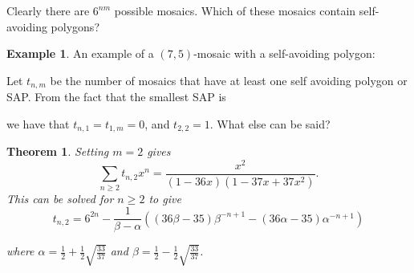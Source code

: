 \documentclass[12pt]{article}
\newtheorem{theorem}{Theorem}
\theoremstyle{plain}
\theoremstyle{definition}
\theoremstyle{remark}
\theoremstyle{definition}
\newtheorem{exmp}{Example}[section]
\newcommand{\cellA}[4]{ \draw[thick] ( #1 , #2 ) rectangle ( #3 , #4 ); \draw[red, thick] (#3 * 0.5 + #1 * 0.5 , #2) -- (#3, #4 * 0.5 + #2 * 0.5);}
\newcommand{\cellB}[4]{ \draw[thick] ( #1 , #2 ) rectangle ( #3 , #4 ); \draw[red, thick] (#3 * 0.5 + #1 * 0.5 , #2) -- (#1, #4 * 0.5 + #2 * 0.5);}
\newcommand{\cellC}[4]{ \draw[thick] ( #1 , #2 ) rectangle ( #3 , #4 ); \draw[red, thick] (#3 * 0.5 + #1 * 0.5 , #4) -- (#1, #4 * 0.5 + #2 * 0.5);}
\newcommand{\cellD}[4]{ \draw[thick] ( #1 , #2 ) rectangle ( #3 , #4 ); \draw[red, thick] (#3 * 0.5 + #1 * 0.5 , #4) -- (#3, #4 * 0.5 + #2 * 0.5);}
\newcommand{\cellE}[4]{ \draw[thick] ( #1 , #2 ) rectangle ( #3 , #4 ); \draw[red, thick] (#3 * 0.5 + #1 * 0.5 , #2) -- (#3 * 0.5 + #1 * 0.5 , #4);}
\newcommand{\cellF}[4]{ \draw[thick] ( #1 , #2 ) rectangle ( #3 , #4 ); \draw[red, thick] (#3, #4 * 0.5 + #2 * 0.5) -- (#1, #4 * 0.5 + #2 * 0.5);}
\newcommand{\cellAf}[4]{\filldraw[gray!40] ( #1 , #2 ) rectangle ( #3 , #4 ); \draw[thick] ( #1 , #2 ) rectangle ( #3 , #4 ); \draw[red, thick] (#3 * 0.5 + #1 * 0.5 , #2) -- (#3, #4 * 0.5 + #2 * 0.5);}
\newcommand{\cellBf}[4]{\filldraw[gray!40] ( #1 , #2 ) rectangle ( #3 , #4 ); \draw[thick] ( #1 , #2 ) rectangle ( #3 , #4 ); \draw[red, thick] (#3 * 0.5 + #1 * 0.5 , #2) -- (#1, #4 * 0.5 + #2 * 0.5);}
\newcommand{\cellCf}[4]{\filldraw[gray!40] ( #1 , #2 ) rectangle ( #3 , #4 ); \draw[thick] ( #1 , #2 ) rectangle ( #3 , #4 ); \draw[red, thick] (#3 * 0.5 + #1 * 0.5 , #4) -- (#1, #4 * 0.5 + #2 * 0.5);}
\newcommand{\cellDf}[4]{\filldraw[gray!40] ( #1 , #2 ) rectangle ( #3 , #4 ); \draw[thick] ( #1 , #2 ) rectangle ( #3 , #4 ); \draw[red, thick] (#3 * 0.5 + #1 * 0.5 , #4) -- (#3, #4 * 0.5 + #2 * 0.5);}
\newcommand{\cellEf}[4]{\filldraw[gray!40] ( #1 , #2 ) rectangle ( #3 , #4 ); \draw[thick] ( #1 , #2 ) rectangle ( #3 , #4 ); \draw[red, thick] (#3 * 0.5 + #1 * 0.5 , #2) -- (#3 * 0.5 + #1 * 0.5 , #4);}
\begin{document}
Clearly there are $6^{nm}$ possible mosaics. Which of these mosaics contain self-avoiding polygons?

\begin{exmp}
An example of a $(7,5)$-mosaic with a self-avoiding polygon:
\begin{center}
\end{center}
\end{exmp}

Let $t_{n,m}$ be the number of mosaics that have at least one self avoiding polygon or SAP. From the fact that the smallest SAP is

\begin{center}
\end{center}

we have that $t_{n,1}=t_{1,m}=0$, and $t_{2,2} = 1$. What else can be said?

\begin{theorem}\label{thm: m=2 case}
Setting $m=2$ gives
\begin{equation}
    \sum_{n \geq 2}t_{n,2}x^n = \frac{x^2}{(1-36x)(1-37x+37x^2)}.
\end{equation}
This can be solved for $n \geq 2$ to give
\begin{equation}
     t_{n,2}= 6^{2n} - \frac{1}{\beta-\alpha}((36\beta-35)\beta^{-n+1} - (36\alpha - 35)\alpha^{-n+1})
\end{equation}

where $\alpha = \frac{1}{2} + \frac{1}{2}\sqrt{\frac{33}{37}}$ and $\beta = \frac{1}{2} - \frac{1}{2}\sqrt{\frac{33}{37}}$.
\end{theorem}
\end{document}
